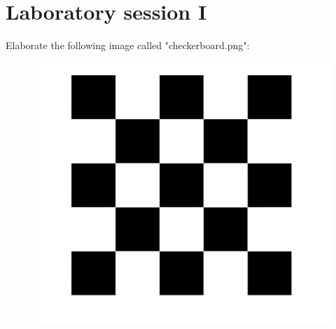 \documentclass[12pt, a4paper]{report}
\newtheorem[style=M,bodystyle=\normalfont]{theorem}{Theorem}
\newtheorem[style=M,bodystyle=\normalfont]{corollary}{Corollary}
\newtheorem[style=M,bodystyle=\normalfont]{lemma}{Lemma}
\newtheorem[style=M,bodystyle=\normalfont]{definition}{Definition}
\begin{document}
\chapter{Laboratory session I}
\begin{Exercise}[label=1]
    Elaborate the following image called "checkerboard.png": 
    \begin{figure}[H]
        \centering
        \includegraphics[width=0.5\linewidth]{images/checkerboard.png}
    \end{figure}
\end{Exercise}
\end{document}
